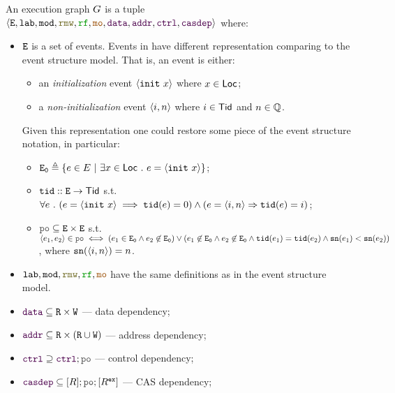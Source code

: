 \documentclass[12pt]{article}
\begin{document}
\begin{definition}
  An \imm execution graph $G$ is a tuple \\
  $\tup{\lE, \lLAB, \lMOD, \lRMW, \lRF, \lMO, \lDATA, \lADDR, \lCTRL, \lCASDEP}$ where:
  \begin{itemize}
    \item ${\mathtt{E}}$ is a set of events. 
      Events in \imm have different representation comparing to the event structure model. 
      That is, an event is either:
      \begin{itemize}
        \item an \emph{initialization} event $\langle {\mathtt{init}}~x \rangle$ where $x \in \mathsf{Loc}$;
        \item a \emph{non-initialization} event $\langle i, n \rangle$ where $i \in \mathsf{Tid}$ and $n \in {\mathbb{Q}}$.
      \end{itemize}
      Given this representation one could restore some piece of the event structure notation, 
      in particular:
      \begin{itemize}
        \item ${\mathtt{E_0}} \triangleq \{e \in E ~|~ \exists{x} \in \mathsf{Loc} ~.~ e = \langle {\mathtt{init}}~x \rangle\}$;
        \item ${\mathtt{tid}} :: {\mathtt{E}} \rightarrow \mathsf{Tid}$ s.t. \\
          $\forall{e} ~.~ (e = \langle {\mathtt{init}}~x \rangle \implies {\mathtt{tid}}(e) = 0) \wedge 
           (e = \langle i, n \rangle \Rightarrow {\mathtt{tid}}(e) = i)$;
        \item $\lPO \subseteq \lE \times \lE$ s.t. \\
          $\tup{e_1, e_2} \in \lPO \iff (e_1 \in \lEi \wedge e_2 \not\in \lEi) \vee 
           (e_1 \not\in \lEi \wedge e_2 \not\in \lEi \wedge \lTID(e_1) = \lTID(e_2) \wedge
            \lSN(e_1) < \lSN(e_2))$, 
          where ${\mathtt{sn}}(\langle i, n \rangle) = n$.
      \end{itemize}
      \item $\lLAB, \lMOD, \lRMW, \lRF, \lMO$ have the same definitions
        as in the event structure model.
      \item $\lDATA \subseteq \lR \times \lW$ --- data dependency;
      \item $\lADDR \subseteq \lR \times (\lR \cup \lW)$ --- address dependency;
      \item $\lCTRL \supseteq \lCTRL; \lPO$ --- control dependency;
      \item $\lCASDEP \subseteq [R];\lPO;[R^{\Ex}]$ --- CAS dependency;
  \end{itemize}
\end{definition}
\end{document}
